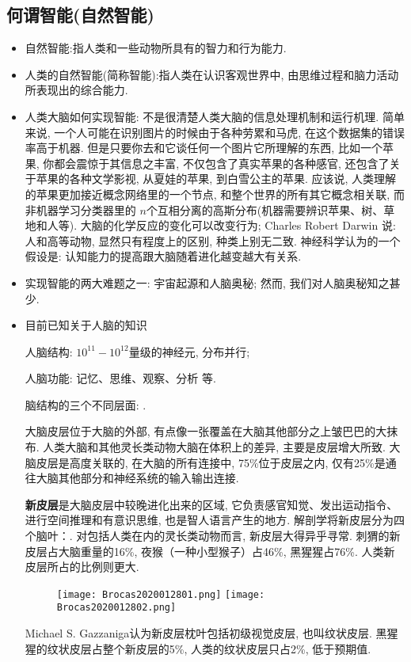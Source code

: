 \subsection{何谓智能(自然智能)}
\begin{itemize}
\item 自然智能:指人类和一些动物所具有的智力和行为能力.

\item 人类的自然智能(简称智能):指人类在认识客观世界中, 由思维过程和脑力活动所表现出的综合能力.

\item 人类大脑如何实现智能: 不是很清楚人类大脑的信息处理机制和运行机理. 简单来说, 一个人可能在识别图片的时候由于各种劳累和马虎, 在这个数据集的错误率高于机器.
但是只要你去和它谈任何一个图片它所理解的东西, 比如一个苹果, 你都会震惊于其信息之丰富, 不仅包含了真实苹果的各种感官, 还包含了关于苹果的各种文学影视, 从夏娃的苹果, 到白雪公主的苹果.
应该说, 人类理解的苹果更加接近概念网络里的一个节点, 和整个世界的所有其它概念相关联,  而非机器学习分类器里的 $n$个互相分离的高斯分布(机器需要辨识苹果、树、草地和人等).
       大脑的化学反应的变化可以改变行为; Charles Robert Darwin 说: 人和高等动物, 显然只有程度上的区别, 种类上别无二致. 神经科学认为的一个假设是: 认知能力的提高跟大脑随着进化越变越大有关系.
\item 实现智能的两大难题之一: 宇宙起源和人脑奥秘; 然而, 我们对人脑奥秘知之甚少.

\item 目前已知关于人脑的知识

      人脑结构: $10^{11}-10^{12}$量级的神经元, 分布并行;

      人脑功能: 记忆、思维、观察、分析 等.

      脑结构的三个不同层面: .

       大脑皮层位于大脑的外部, 有点像一张覆盖在大脑其他部分之上皱巴巴的大抹布.
      人类大脑和其他灵长类动物大脑在体积上的差异, 主要是皮层增大所致.
      大脑皮层是高度关联的, 在大脑的所有连接中, 75\%位于皮层之内, 仅有25\%是通往大脑其他部分和神经系统的输入输出连接.

      \textbf{新皮层}是大脑皮层中较晚进化出来的区域, 它负责感官知觉、发出运动指令、进行空间推理和有意识思维, 也是智人语言产生的地方.
      解剖学将新皮层分为四个脑叶：. 对包括人类在内的灵长类动物而言, 新皮层大得异乎寻常.
      刺猬的新皮层占大脑重量的16\%, 夜猴（一种小型猴子）占46\%, 黑猩猩占76\%. 人类新皮层所占的比例则更大.
    \begin{figure}[H]
    \begin{center}
    \quad\quad\quad
    \texttt{[image: Brocas2020012801.png]}
    \texttt{[image: Brocas2020012802.png]}
    \end{center}
    \label{Brocas2020012801}
    \end{figure}
      Michael S. Gazzaniga认为新皮层枕叶包括初级视觉皮层, 也叫纹状皮层. 黑猩猩的纹状皮层占整个新皮层的5\%, 人类的纹状皮层只占2\%, 低于预期值.


\end{itemize}
